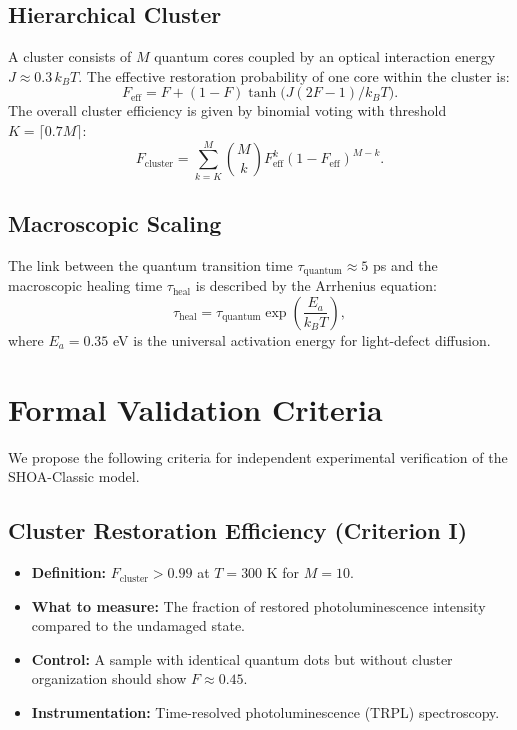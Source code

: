\documentclass[12pt]{article}
\begin{document}
\subsection{Hierarchical Cluster}
A cluster consists of $M$ quantum cores coupled by an optical interaction energy $J \approx 0.3\,k_B T$. The effective restoration probability of one core within the cluster is:
\begin{equation}
F_{\text{eff}} = F + (1-F)\tanh\bigl(J(2F-1)/k_B T\bigr).
\end{equation}
The overall cluster efficiency is given by binomial voting with threshold $K = \lceil 0.7M \rceil$:
\begin{equation}
F_{\text{cluster}} = \sum_{k=K}^{M} \binom{M}{k} F_{\text{eff}}^k (1-F_{\text{eff}})^{M-k}.
\end{equation}

\subsection{Macroscopic Scaling}
The link between the quantum transition time $\tau_{\text{quantum}} \approx 5$ ps and the macroscopic healing time $\tau_{\text{heal}}$ is described by the Arrhenius equation:
\begin{equation}
\tau_{\text{heal}} = \tau_{\text{quantum}} \exp\!\left(\frac{E_a}{k_B T}\right),
\end{equation}
where $E_a = 0.35$ eV is the universal activation energy for light-defect diffusion.

\section{Formal Validation Criteria}
We propose the following criteria for independent experimental verification of the SHOA-Classic model.

\subsection{Cluster Restoration Efficiency (Criterion I)}
\begin{itemize}
    \item \textbf{Definition:} $F_{\text{cluster}} > 0.99$ at $T=300$ K for $M=10$.
    \item \textbf{What to measure:} The fraction of restored photoluminescence intensity compared to the undamaged state.
    \item \textbf{Control:} A sample with identical quantum dots but without cluster organization should show $F \approx 0.45$.
    \item \textbf{Instrumentation:} Time-resolved photoluminescence (TRPL) spectroscopy.
\end{itemize}
\end{document}
